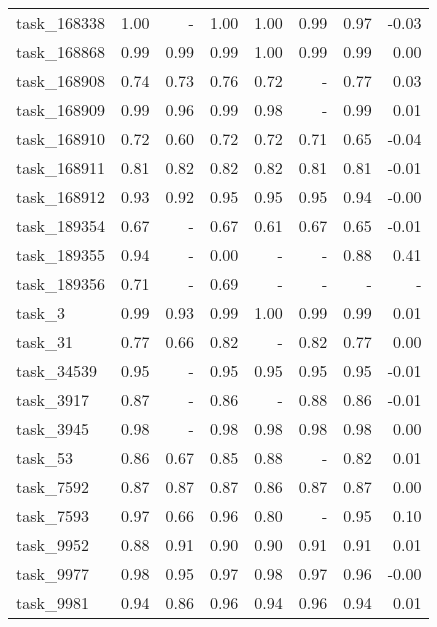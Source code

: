 \begin{tabular}{lrrrrrrr}
 task\_168338 &       1.00 &         - &          1.00 & 1.00 &  0.99 &      0.97 & -0.03 \\
 task\_168868 &       0.99 &      0.99 &          0.99 & 1.00 &  0.99 &      0.99 &  0.00 \\
 task\_168908 &       0.74 &      0.73 &          0.76 & 0.72 &     - &      0.77 &  0.03 \\
 task\_168909 &       0.99 &      0.96 &          0.99 & 0.98 &     - &      0.99 &  0.01 \\
 task\_168910 &       0.72 &      0.60 &          0.72 & 0.72 &  0.71 &      0.65 & -0.04 \\
 task\_168911 &       0.81 &      0.82 &          0.82 & 0.82 &  0.81 &      0.81 & -0.01 \\
 task\_168912 &       0.93 &      0.92 &          0.95 & 0.95 &  0.95 &      0.94 & -0.00 \\
 task\_189354 &       0.67 &         - &          0.67 & 0.61 &  0.67 &      0.65 & -0.01 \\
 task\_189355 &       0.94 &         - &          0.00 &    - &     - &      0.88 &  0.41 \\
 task\_189356 &       0.71 &         - &          0.69 &    - &     - &         - &     - \\
      task\_3 &       0.99 &      0.93 &          0.99 & 1.00 &  0.99 &      0.99 &  0.01 \\
     task\_31 &       0.77 &      0.66 &          0.82 &    - &  0.82 &      0.77 &  0.00 \\
  task\_34539 &       0.95 &         - &          0.95 & 0.95 &  0.95 &      0.95 & -0.01 \\
   task\_3917 &       0.87 &         - &          0.86 &    - &  0.88 &      0.86 & -0.01 \\
   task\_3945 &       0.98 &         - &          0.98 & 0.98 &  0.98 &      0.98 &  0.00 \\
     task\_53 &       0.86 &      0.67 &          0.85 & 0.88 &     - &      0.82 &  0.01 \\
   task\_7592 &       0.87 &      0.87 &          0.87 & 0.86 &  0.87 &      0.87 &  0.00 \\
   task\_7593 &       0.97 &      0.66 &          0.96 & 0.80 &     - &      0.95 &  0.10 \\
   task\_9952 &       0.88 &      0.91 &          0.90 & 0.90 &  0.91 &      0.91 &  0.01 \\
   task\_9977 &       0.98 &      0.95 &          0.97 & 0.98 &  0.97 &      0.96 & -0.00 \\
   task\_9981 &       0.94 &      0.86 &          0.96 & 0.94 &  0.96 &      0.94 &  0.01 \\
\bottomrule
\end{tabular}
